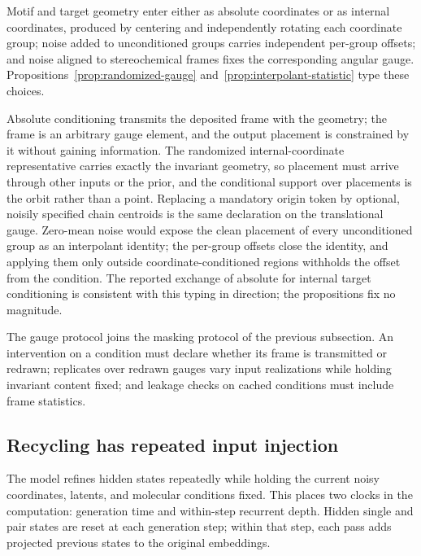 Motif and target geometry enter either as absolute coordinates or as internal coordinates,
produced by centering and independently rotating each coordinate group; noise added to
unconditioned groups carries independent per-group offsets; and noise aligned to stereochemical
frames fixes the corresponding angular gauge.  Propositions~\ref{prop:randomized-gauge}
and~\ref{prop:interpolant-statistic} type these choices.

Absolute conditioning transmits the deposited frame with the geometry; the frame is an arbitrary
gauge element, and the output placement is constrained by it without gaining information.  The
randomized internal-coordinate representative carries exactly the invariant geometry, so
placement must arrive through other inputs or the prior, and the conditional support over
placements is the orbit rather than a point.  Replacing a mandatory origin token by optional,
noisily specified chain centroids is the same declaration on the translational gauge.  Zero-mean
noise would expose the clean placement of every unconditioned group as an interpolant identity;
the per-group offsets close the identity, and applying them only outside coordinate-conditioned
regions withholds the offset from the condition.  The reported exchange of absolute for internal
target conditioning is consistent with this typing in direction; the propositions fix no
magnitude.

The gauge protocol joins the masking protocol of the previous subsection.  An intervention on a
condition must declare whether its frame is transmitted or redrawn; replicates over redrawn
gauges vary input realizations while holding invariant content fixed; and leakage checks on
cached conditions must include frame statistics.

\subsection{Recycling has repeated input injection}

The model refines hidden states repeatedly while holding the current noisy coordinates, latents,
and molecular conditions fixed.  This places two clocks in the computation: generation time and
within-step recurrent depth.  Hidden single and pair states are reset at each generation step;
within that step, each pass adds projected previous states to the original embeddings.


